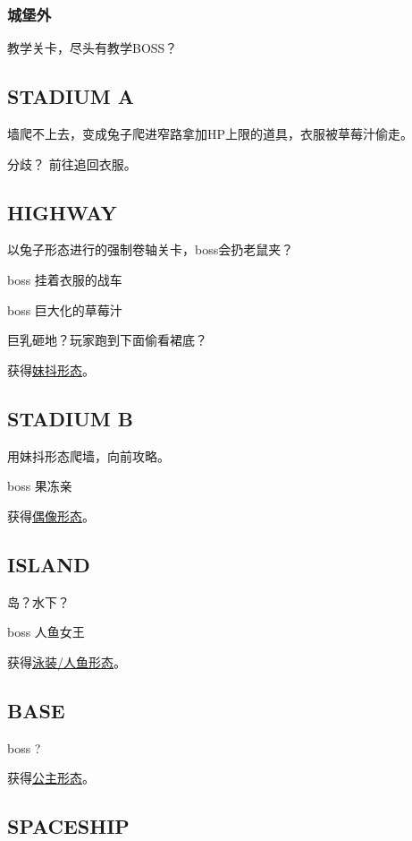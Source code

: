 \documentclass{article}
\begin{document}
\subsubsection{城堡外}

教学关卡，尽头有教学BOSS？

\subsection{STADIUM A}

墙爬不上去，变成兔子爬进窄路拿加HP上限的道具，衣服被草莓汁偷走。

分歧？ 前往追回衣服。

\subsection{HIGHWAY}

以兔子形态进行的强制卷轴关卡，boss会扔老鼠夹？

boss 挂着衣服的战车

boss 巨大化的草莓汁

巨乳砸地？玩家跑到下面偷看裙底？

获得\hyperref[costume_maid]{妹抖形态}。

\subsection{STADIUM B}

用妹抖形态爬墙，向前攻略。

boss 果冻亲

获得\hyperref[costume_idol]{偶像形态}。

\subsection{ISLAND}

岛？水下？

boss 人鱼女王

获得\hyperref[costume_mermaid]{泳装/人鱼形态}。

\subsection{BASE}

boss ?

获得\hyperref[costume_hime]{公主形态}。

\subsection{SPACESHIP}
\end{document}

